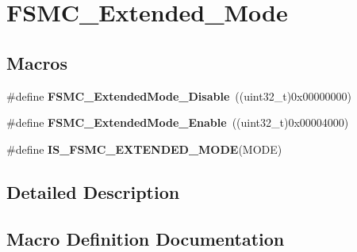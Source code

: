 \hypertarget{group___f_s_m_c___extended___mode}{}\section{F\+S\+M\+C\+\_\+\+Extended\+\_\+\+Mode}
\label{group___f_s_m_c___extended___mode}
\subsection*{Macros}
\begin{DoxyCompactItemize}
\item 
\hypertarget{group___f_s_m_c___extended___mode_ga5a1f1acdc44328158f59012748980dd3}{}\#define {\bfseries F\+S\+M\+C\+\_\+\+Extended\+Mode\+\_\+\+Disable}~((uint32\+\_\+t)0x00000000)\label{group___f_s_m_c___extended___mode_ga5a1f1acdc44328158f59012748980dd3}

\item 
\hypertarget{group___f_s_m_c___extended___mode_gaef9ff4c81a52fdb0471d2c4422271d2a}{}\#define {\bfseries F\+S\+M\+C\+\_\+\+Extended\+Mode\+\_\+\+Enable}~((uint32\+\_\+t)0x00004000)\label{group___f_s_m_c___extended___mode_gaef9ff4c81a52fdb0471d2c4422271d2a}

\item 
\#define {\bfseries I\+S\+\_\+\+F\+S\+M\+C\+\_\+\+E\+X\+T\+E\+N\+D\+E\+D\+\_\+\+M\+O\+D\+E}(M\+O\+D\+E)
\end{DoxyCompactItemize}


\subsection{Detailed Description}


\subsection{Macro Definition Documentation}
\hypertarget{group___f_s_m_c___extended___mode_ga79849ea07bf2a8f09989a6babd9e66e2}{}
